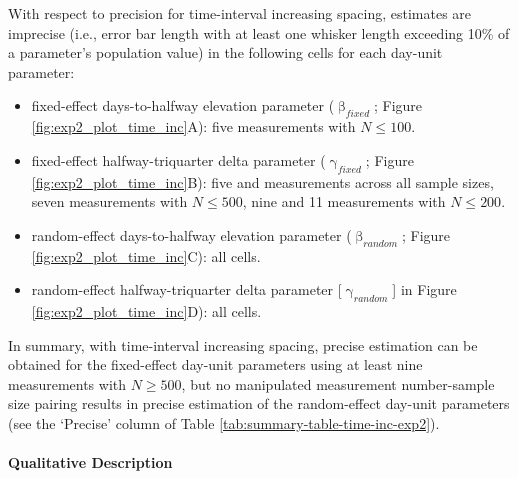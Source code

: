 \documentclass[
12pt, %
twoside,
english]{guelphthesis}
\theoremstyle{definition}
\theoremstyle{definition}
\theoremstyle{definition}
\theoremstyle{definition}
\theoremstyle{remark}
\begin{document}
With respect to precision for time-interval increasing spacing, estimates are imprecise (i.e., error bar length with at least one whisker length exceeding 10\% of a parameter's population value) in the following cells for each day-unit parameter:
\begin{itemize}
\tightlist
\item
  fixed-effect days-to-halfway elevation parameter (\(\upbeta_{fixed}\); Figure \ref{fig:exp2_plot_time_inc}A): five measurements with \(N \le 100\).
\item
  fixed-effect halfway-triquarter delta parameter (\(\upgamma_{fixed}\); Figure \ref{fig:exp2_plot_time_inc}B): five and measurements across all sample sizes, seven measurements with \(N \le 500\), nine and 11 measurements with \(N \le 200\).
\item
  random-effect days-to-halfway elevation parameter (\(\upbeta_{random}\); Figure \ref{fig:exp2_plot_time_inc}C): all cells.
\item
  random-effect halfway-triquarter delta parameter {[}\(\upgamma_{random}\){]} in Figure \ref{fig:exp2_plot_time_inc}D): all cells.
\end{itemize}
In summary, with time-interval increasing spacing, precise estimation can be obtained for the fixed-effect day-unit parameters using at least nine measurements with \(N \ge 500\), but no manipulated measurement number-sample size pairing results in precise estimation of the random-effect day-unit parameters (see the `Precise' column of Table \ref{tab:summary-table-time-inc-exp2}).

\hypertarget{qualitative-time-inc-exp2}{%
\paragraph{Qualitative Description}\label{qualitative-time-inc-exp2}}
\end{document}
